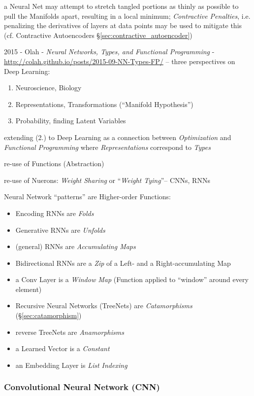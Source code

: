 a Neural Net may attempt to stretch tangled portions as thinly as possible to
pull the Manifolds apart, resulting in a local minimum; \emph{Contractive
  Penalties}, i.e. penalizing the derivatives of layers at data points may be
used to mitigate this (cf. Contractive Autoencoders
\S\ref{sec:contractive_autoencoder})

\asterism

2015 - Olah - \emph{Neural Networks, Types, and Functional Programming}
- \url{http://colah.github.io/posts/2015-09-NN-Types-FP/} --
three perspectives on Deep Learning:
\begin{enumerate}
  \item Neuroscience, Biology
  \item Representations, Transformations (``Manifold Hypothesis'')
  \item Probability, finding Latent Variables
\end{enumerate}
extending (2.) to Deep Learning as a connection between \emph{Optimization} and
\emph{Functional Programming} where \emph{Representations} correspond to
\emph{Types}

re-use of Functions (Abstraction)

re-use of Nuerons: \emph{Weight Sharing} or ``\emph{Weight Tying}''-- CNNs, RNNs

Neural Network ``patterns'' are Higher-order Functions:
\begin{itemize}
  \item Encoding RNNs are \emph{Folds}
  \item Generative RNNs are \emph{Unfolds}
  \item (general) RNNs are \emph{Accumulating Maps}
  \item Bidirectional RNNs are a \emph{Zip} of a Left- and a Right-accumulating
    Map
  \item a Conv Layer is a \emph{Window Map} (Function applied to ``window''
    around every element)
  \item Recursive Neural Networks (TreeNets) are \emph{Catamorphisms}
    (\S\ref{sec:catamorphism})
  \item reverse TreeNets are \emph{Anamorphisms}
  \item a Learned Vector is a \emph{Constant}
  \item an Embedding Layer is \emph{List Indexing}
\end{itemize}



\subsubsection{Convolutional Neural Network (CNN)}\label{sec:cnn}

